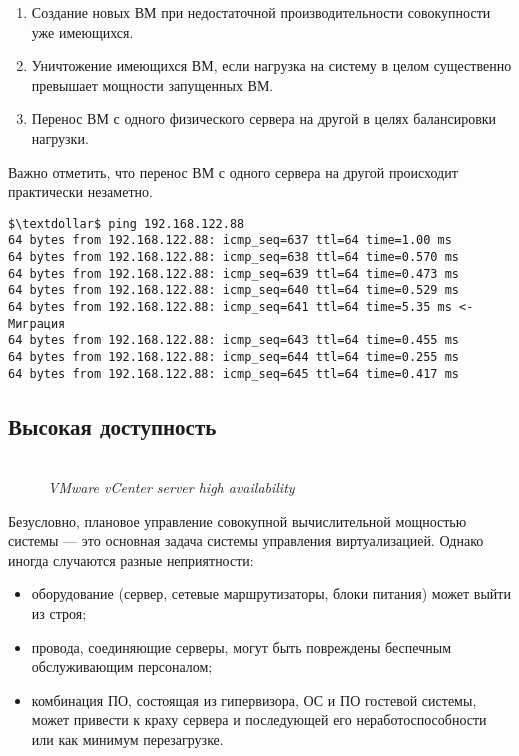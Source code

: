 \documentclass[14pt, a4paper]{article}
\begin{document}
\begin{enumerate}
    \item Создание новых ВМ при недостаточной производительности совокупности уже имеющихся.
    \item Уничтожение имеющихся ВМ, если нагрузка на систему в целом существенно превышает
    мощности запущенных ВМ.
    \item Перенос ВМ с одного физического сервера на другой в целях балансировки нагрузки.
\end{enumerate}

Важно отметить, что перенос ВМ с одного сервера на другой происходит практически незаметно.
\vspace{0.3cm}
\begin{lstlisting}
$\textdollar$ ping 192.168.122.88
64 bytes from 192.168.122.88: icmp_seq=637 ttl=64 time=1.00 ms
64 bytes from 192.168.122.88: icmp_seq=638 ttl=64 time=0.570 ms
64 bytes from 192.168.122.88: icmp_seq=639 ttl=64 time=0.473 ms
64 bytes from 192.168.122.88: icmp_seq=640 ttl=64 time=0.529 ms
64 bytes from 192.168.122.88: icmp_seq=641 ttl=64 time=5.35 ms <- Миграция 
64 bytes from 192.168.122.88: icmp_seq=643 ttl=64 time=0.455 ms
64 bytes from 192.168.122.88: icmp_seq=644 ttl=64 time=0.255 ms
64 bytes from 192.168.122.88: icmp_seq=645 ttl=64 time=0.417 ms
\end{lstlisting}

\subsection*{Высокая доступность} 

\begin{figure}[h]
    \centering
    \\ 
    \small\textit{VMware vCenter server high availability}  
    \label{framework} 
\end{figure}

Безусловно, плановое управление совокупной вычислительной мощностью системы — это основная
задача системы управления виртуализацией. Однако иногда случаются разные неприятности:

\begin{itemize}
    \item оборудование (сервер, сетевые маршрутизаторы, блоки питания) может выйти из строя;
    \item провода, соединяющие серверы, могут быть повреждены беспечным обслуживающим
    персоналом;
    \item комбинация ПО, состоящая из гипервизора, ОС и ПО гостевой системы, может привести к
    краху сервера и последующей его неработоспособности или как минимум перезагрузке.
\end{itemize}
\end{document}
